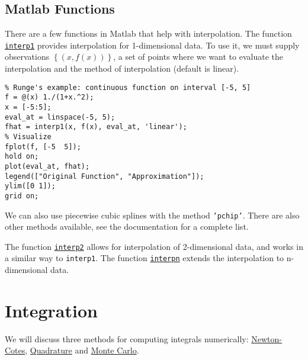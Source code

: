 \documentclass[12pt, a4paper]{article}
\newcommand{\Set}[1]{\left\{#1\right\}}
\begin{document}
\subsection{Matlab Functions}
\label{sec:org9e06026}
There are a few functions in Matlab that help with interpolation.
The function \href{https://www.mathworks.com/help/matlab/ref/interp1.html?s\_tid=doc\_ta}{\texttt{interp1}} provides interpolation for 1-dimensional data.
To use it, we must supply observations \(\Set{(x, f(x))}\), a set of points where we want to evaluate the interpolation and the method of interpolation (default is linear).
\lstset{language=matlab,label= ,caption= ,captionpos=b,firstnumber=1,numbers=left,style=Matlab-editor}
\begin{lstlisting}
% Runge's example: continuous function on interval [-5, 5]
f = @(x) 1./(1+x.^2);
x = [-5:5];
eval_at = linspace(-5, 5);
fhat = interp1(x, f(x), eval_at, 'linear');
% Visualize
fplot(f, [-5  5]);
hold on;
plot(eval_at, fhat);
legend(["Original Function", "Approximation"]);
ylim([0 1]);
grid on;
\end{lstlisting}
We can also use piecewise cubic splines with the method \texttt{'pchip'}.
There are also other methods available, see the documentation for a complete list.

The function \href{https://www.mathworks.com/help/matlab/ref/interp2.html}{\texttt{interp2}} allows for interpolation of 2-dimensional data, and works in a similar way to \texttt{interp1}.
The function \href{https://www.mathworks.com/help/matlab/ref/interpn.html}{\texttt{interpn}} extends the interpolation to n-dimensional data.
\section{Integration}
\label{sec:orgcaca6db}
We will discuss three methods for computing integrals numerically: \href{https://en.wikipedia.org/wiki/Newton–Cotes\_formulas}{Newton-Cotes}, \href{https://en.wikipedia.org/wiki/Numerical\_integration\#Quadrature\_rules\_based\_on\_interpolating\_functions}{Quadrature} and \href{https://en.wikipedia.org/wiki/Monte\_Carlo\_integration}{Monte Carlo}.
\end{document}
